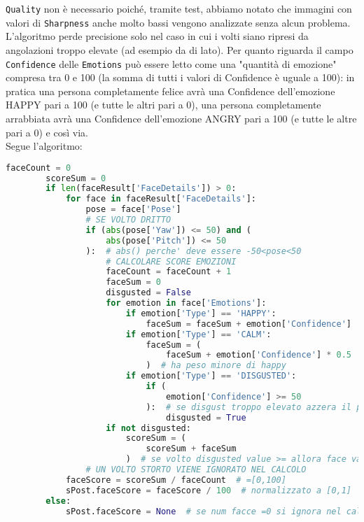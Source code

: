 \verb+Quality+ non è necessario poiché, tramite test, abbiamo notato che immagini con valori di 
\verb+Sharpness+ anche molto bassi vengono analizzate senza alcun problema. L'algoritmo perde precisione
solo nel caso in cui i volti siano ripresi da angolazioni troppo elevate (ad esempio da di lato).
Per quanto riguarda il campo \verb+Confidence+ delle \verb+Emotions+ può essere letto come una
"quantità di emozione" compresa tra 0 e 100 (la somma di tutti i valori di Confidence è uguale a 100):
in pratica una persona completamente felice avrà una Confidence dell'emozione HAPPY pari a 100 
(e tutte le altri pari a 0), una persona completamente arrabbiata avrà una Confidence 
dell'emozione ANGRY pari a 100 (e tutte le altre pari a 0) e così via.\\
Segue l'algoritmo: 
\begin{lstlisting}[language=Python]
    faceCount = 0
        scoreSum = 0
        if len(faceResult['FaceDetails']) > 0:
            for face in faceResult['FaceDetails']:
                pose = face['Pose']
                # SE VOLTO DRITTO
                if (abs(pose['Yaw']) <= 50) and (
                    abs(pose['Pitch']) <= 50
                ):  # abs() perche' deve essere -50<pose<50
                    # CALCOLARE SCORE EMOZIONI
                    faceCount = faceCount + 1
                    faceSum = 0
                    disgusted = False
                    for emotion in face['Emotions']:
                        if emotion['Type'] == 'HAPPY':
                            faceSum = faceSum + emotion['Confidence']
                        if emotion['Type'] == 'CALM':
                            faceSum = (
                                faceSum + emotion['Confidence'] * 0.5
                            )  # ha peso minore di happy
                        if emotion['Type'] == 'DISGUSTED':
                            if (
                                emotion['Confidence'] >= 50
                            ):  # se disgust troppo elevato azzera il punteggio della faccia
                                disgusted = True
                    if not disgusted:
                        scoreSum = (
                            scoreSum + faceSum
                        )  # se volto disgusted value >= allora face value = 0
                # UN VOLTO STORTO VIENE IGNORATO NEL CALCOLO
            faceScore = scoreSum / faceCount  # =[0,100]
            sPost.faceScore = faceScore / 100  # normalizzato a [0,1]
        else:
            sPost.faceScore = None  # se num facce =0 si ignora nel calcolo di final Score
            
\end{lstlisting}

